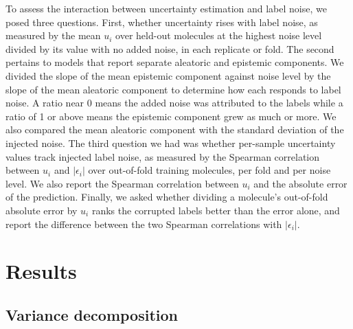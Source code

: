 To assess the interaction between uncertainty estimation and label noise, we posed three questions. First, whether uncertainty rises with label noise, as measured by the mean $u_i$ over held-out molecules at the highest noise level
divided by its value with no added noise, in each replicate or fold. The second pertains to models that report separate aleatoric and epistemic components. We divided the slope of the mean epistemic component against noise level by the slope of the mean aleatoric component to determine how each responds to label noise. A ratio near 0 means the added noise was attributed to the labels while a ratio of 1 or above means the epistemic component grew as much or more. We also compared the mean aleatoric component with the standard deviation of the injected noise. The third question we had was whether per-sample uncertainty values track injected label noise, as measured by the Spearman correlation between $u_i$ and $|\epsilon_i|$ over out-of-fold training molecules, per fold and per noise level. We also report the Spearman correlation between $u_i$ and the absolute error of the prediction. Finally, we asked whether dividing a molecule's out-of-fold absolute error by $u_i$ ranks the corrupted labels better than the error alone, and report the difference between the two Spearman correlations with $|\epsilon_i|$.

\section{Results}

\subsection{Variance decomposition}

